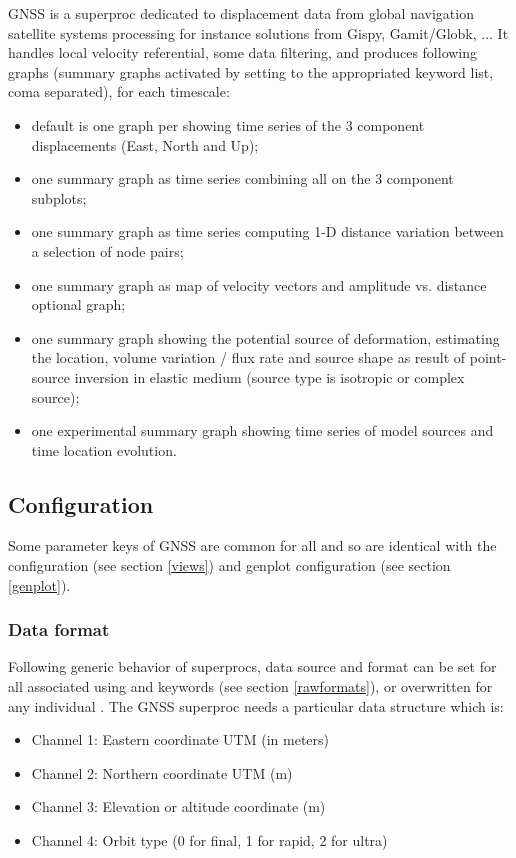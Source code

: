 GNSS is a superproc dedicated to displacement data from global navigation satellite systems processing for instance solutions from Gispy, Gamit/Globk, ... It handles local velocity referential, some data filtering, and produces following graphs (summary graphs activated by setting  to the appropriated keyword list, coma separated), for each timescale:
\begin{itemize}
\item default is one graph per  showing time series of the 3 component displacements (East, North and Up);
\item one summary graph  as time series combining all  on the 3 component subplots;
\item one summary graph  as time series computing 1-D distance variation between a selection of node pairs;
\item one summary graph  as map of velocity vectors and amplitude vs. distance optional graph;
\item one summary graph  showing the potential source of deformation, estimating the location, volume variation / flux rate and source shape as result of point-source inversion in elastic medium (source type is isotropic or complex source);
\item one experimental summary graph  showing time series of model sources and time location evolution.
\end{itemize}


\subsection{Configuration}

Some parameter keys of GNSS are common for all  and  so are identical with the  configuration (see section \ref{views}) and genplot  configuration (see section \ref{genplot}).


\subsubsection{Data format}

Following generic behavior of superprocs, data source and format can be set for all associated  using  and  keywords (see section \ref{rawformats}), or overwritten for any individual . The GNSS superproc needs a particular data structure which is:
\begin{itemize}
\item Channel 1: Eastern coordinate UTM (in meters)
\item Channel 2: Northern coordinate UTM (m)
\item Channel 3: Elevation or altitude coordinate (m)
\item Channel 4: Orbit type (0 for final, 1 for rapid, 2 for ultra)
\end{itemize}

